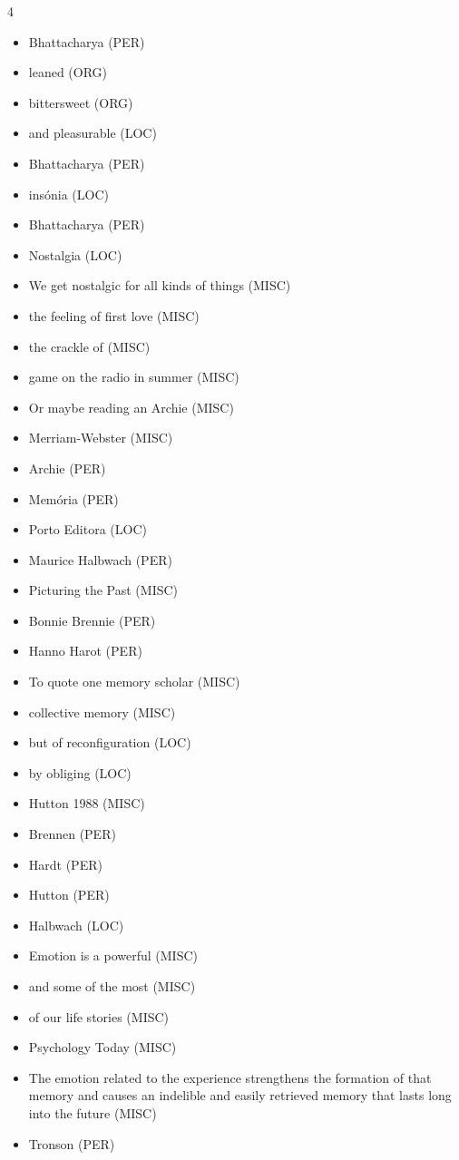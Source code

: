 \documentclass{article}
\begin{document}
\begin{multicols}{4}
\begin{itemize}
\item Bhattacharya (PER)
\item leaned (ORG)
\item bittersweet (ORG)
\item and 
pleasurable (LOC)
\item Bhattacharya (PER)
\item insónia (LOC)
\item Bhattacharya (PER)
\item Nostalgia (LOC)
\item We get nostalgic for all kinds 
of things (MISC)
\item the feeling of first love (MISC)
\item the 
crackle of (MISC)
\item game on the radio in summer (MISC)
\item Or maybe reading an Archie (MISC)
\item Merriam-Webster (MISC)
\item Archie (PER)
\item Memória (PER)
\item Porto Editora (LOC)
\item Maurice  Halbwach (PER)
\item Picturing the Past (MISC)
\item Bonnie Brennie (PER)
\item Hanno Harot (PER)
\item To quote one memory scholar (MISC)
\item collective memory (MISC)
\item but  of  reconfiguration (LOC)
\item by  obliging   (LOC)
\item Hutton 1988 (MISC)
\item Brennen (PER)
\item Hardt (PER)
\item Hutton (PER)
\item Halbwach (LOC)
\item Emotion is a powerful (MISC)
\item and some of the most (MISC)
\item of our life stories 
 (MISC)
\item Psychology Today (MISC)
\item The emotion related to the experience strengthens the formation of that memory 
and causes an indelible and easily retrieved memory that lasts long into the future (MISC)
\item Tronson (PER)

\end{itemize}
\end{multicols}
\end{document}

